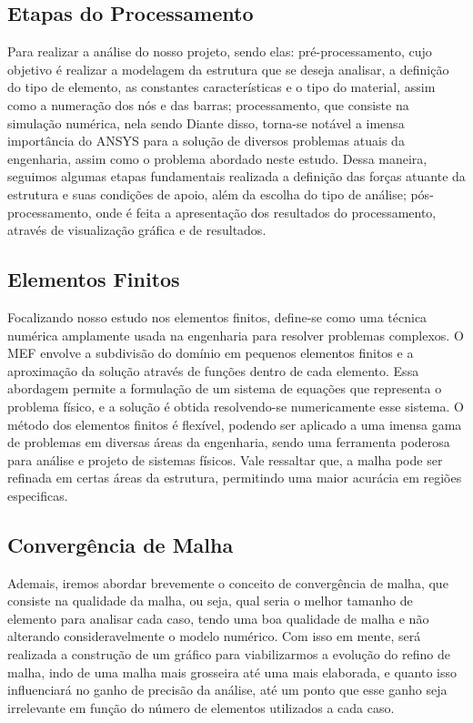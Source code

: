 \documentclass[deposito, acronym, symbols]{fei}
\begin{document}
\subsection{Etapas do Processamento}

Para realizar a análise do nosso projeto, sendo elas: pré-processamento, cujo objetivo é realizar a modelagem da estrutura que se deseja analisar, a definição do tipo de elemento, as constantes características e o tipo do material, assim como a numeração dos nós e das barras; processamento, que consiste na simulação numérica, nela sendo Diante disso, torna-se notável a imensa importância do ANSYS para a solução de diversos problemas atuais da engenharia, assim como o problema abordado neste estudo. Dessa maneira, seguimos algumas etapas fundamentais realizada a definição das forças atuante da estrutura e suas condições de apoio, além da escolha do tipo de análise; pós-processamento, onde é feita a apresentação dos resultados do processamento, através de visualização gráfica e de resultados.

\subsection{Elementos Finitos}
Focalizando nosso estudo nos elementos finitos, define-se como uma técnica numérica amplamente usada na engenharia para resolver problemas complexos. O MEF envolve a subdivisão do domínio em pequenos elementos finitos e a aproximação da solução através de funções dentro de cada elemento. Essa abordagem permite a formulação de um sistema de equações que representa o problema físico, e a solução é obtida resolvendo-se numericamente esse sistema. O método dos elementos finitos é flexível, podendo ser aplicado a uma imensa gama de problemas em diversas áreas da engenharia, sendo uma ferramenta poderosa para análise e projeto de sistemas físicos. Vale ressaltar que, a malha pode ser refinada em certas áreas da estrutura, permitindo uma maior acurácia em regiões especificas.

\subsection{Convergência de Malha}
Ademais, iremos abordar brevemente o conceito de convergência de malha, que consiste na qualidade da malha, ou seja, qual seria o melhor tamanho de elemento para analisar cada caso, tendo uma boa qualidade de malha e não alterando consideravelmente o modelo numérico. Com isso em mente, será realizada a construção de um gráfico para viabilizarmos a evolução do refino de malha, indo de uma malha mais grosseira até uma mais elaborada, e quanto isso influenciará no ganho de precisão da análise, até um ponto que esse ganho seja irrelevante em função do número de elementos utilizados a cada caso.
\end{document}
